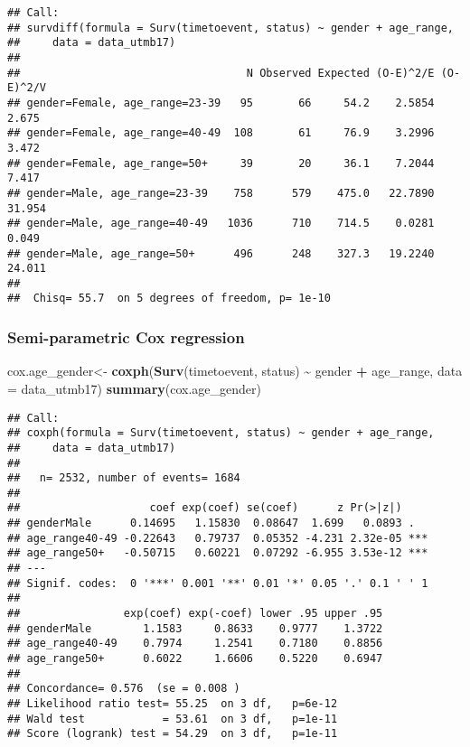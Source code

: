 \documentclass[
]{article}
\newenvironment{Shaded}{\begin{snugshade}}{\end{snugshade}}
\newcommand{\AttributeTok}[1]{\textcolor[rgb]{0.13,0.29,0.53}{#1}}
\newcommand{\FunctionTok}[1]{\textcolor[rgb]{0.13,0.29,0.53}{\textbf{#1}}}
\newcommand{\NormalTok}[1]{#1}
\newcommand{\OtherTok}[1]{\textcolor[rgb]{0.56,0.35,0.01}{#1}}
\newcommand{\SpecialCharTok}[1]{\textcolor[rgb]{0.81,0.36,0.00}{\textbf{#1}}}
\begin{document}
\begin{verbatim}
## Call:
## survdiff(formula = Surv(timetoevent, status) ~ gender + age_range, 
##     data = data_utmb17)
## 
##                                   N Observed Expected (O-E)^2/E (O-E)^2/V
## gender=Female, age_range=23-39   95       66     54.2    2.5854     2.675
## gender=Female, age_range=40-49  108       61     76.9    3.2996     3.472
## gender=Female, age_range=50+     39       20     36.1    7.2044     7.417
## gender=Male, age_range=23-39    758      579    475.0   22.7890    31.954
## gender=Male, age_range=40-49   1036      710    714.5    0.0281     0.049
## gender=Male, age_range=50+      496      248    327.3   19.2240    24.011
## 
##  Chisq= 55.7  on 5 degrees of freedom, p= 1e-10
\end{verbatim}

\hypertarget{semi-parametric-cox-regression-2}{%
\subsubsection{\texorpdfstring{Semi-parametric Cox regression
}{Semi-parametric Cox regression }}\label{semi-parametric-cox-regression-2}}

\begin{Shaded}
\begin{Highlighting}[]
\NormalTok{cox.age\_gender}\OtherTok{\textless{}{-}} \FunctionTok{coxph}\NormalTok{(}\FunctionTok{Surv}\NormalTok{(timetoevent, status) }\SpecialCharTok{\textasciitilde{}}\NormalTok{ gender }\SpecialCharTok{+}\NormalTok{ age\_range, }\AttributeTok{data =}\NormalTok{ data\_utmb17)}
\FunctionTok{summary}\NormalTok{(cox.age\_gender)}
\end{Highlighting}
\end{Shaded}

\begin{verbatim}
## Call:
## coxph(formula = Surv(timetoevent, status) ~ gender + age_range, 
##     data = data_utmb17)
## 
##   n= 2532, number of events= 1684 
## 
##                    coef exp(coef) se(coef)      z Pr(>|z|)    
## genderMale      0.14695   1.15830  0.08647  1.699   0.0893 .  
## age_range40-49 -0.22643   0.79737  0.05352 -4.231 2.32e-05 ***
## age_range50+   -0.50715   0.60221  0.07292 -6.955 3.53e-12 ***
## ---
## Signif. codes:  0 '***' 0.001 '**' 0.01 '*' 0.05 '.' 0.1 ' ' 1
## 
##                exp(coef) exp(-coef) lower .95 upper .95
## genderMale        1.1583     0.8633    0.9777    1.3722
## age_range40-49    0.7974     1.2541    0.7180    0.8856
## age_range50+      0.6022     1.6606    0.5220    0.6947
## 
## Concordance= 0.576  (se = 0.008 )
## Likelihood ratio test= 55.25  on 3 df,   p=6e-12
## Wald test            = 53.61  on 3 df,   p=1e-11
## Score (logrank) test = 54.29  on 3 df,   p=1e-11
\end{verbatim}
\end{document}
